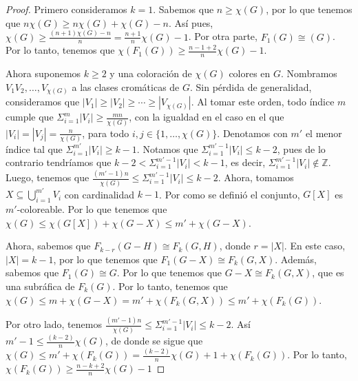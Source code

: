 \begin{proof}
    Primero consideramos $k=1$. Sabemos que $n \geq \chi(G)$, por lo que tenemos
    que $n\chi(G) \geq n\chi(G) + \chi(G) -n$. As\'i pues, $\chi (G) \geq
    \frac{(n+1)\chi(G)-n}{n} = \frac{n+1}{n}\chi (G) -1$. Por otra parte,
    $F_1(G) \cong (G)$. Por lo tanto, tenemos que $\chi(F_1(G)) \geq
    \frac{n-1+2}{n} \chi(G) -1$.
        
    Ahora suponemos $k \geq 2$ y una coloraci\'on de $\chi(G)$ colores en $G$.
    Nombramos $V_1 V_2, \dots, V_{\chi(G)}$ a las clases crom\'aticas de $G$.
    Sin p\'erdida de generalidad, consideramos que $|V_1|\geq |V_2|\geq \cdots
    \geq |V_{\chi(G)}|$. Al tomar este orden, todo \'indice $m$ cumple que
    $\Sigma_{i=1}^{m}|V_i| \geq \frac{mn}{\chi(G)}$, con la igualdad en el caso
    en el que $|V_i| = |V_j| = \frac{n}{\chi(G)}$, para todo $i,j \in \{1,
    \dots, \chi(G)\}$. Denotamos con $m'$ el menor \'indice tal que
    $\Sigma_{i=1}^{m'}|V_i| \geq k-1$. Notamos que $\Sigma_{i=1}^{m'-1}|V_i|
    \leq k-2$, pues de lo contrario tendr\'iamos que
    $k-2<\Sigma_{i=1}^{m'-1}|V_i| < k-1$, es decir, $\Sigma_{i=1}^{m'-1}|V_i|
    \notin \mathbb{Z}$. Luego, tenemos que $\frac{(m'-1)n}{\chi(G)}\leq
    \Sigma_{i=1}^{m'-1}|V_i| \leq k-2$. Ahora, tomamos $X \subseteq
    \bigcup_{i=1}^{m'} V_i$ con cardinalidad $k-1$. Por como se defini\'o el
    conjunto, $G[X]$ es $m'$-coloreable.
    Por lo que tenemos que  $\chi(G) \leq \chi(G[X])+\chi(G-X) \leq m' +
    \chi(G-X)$.
        
    Ahora, sabemos que $F_{k-r}(G-H) \cong F_k(G,H)$, donde $r = |X|$. En este
    caso, $|X| = k-1$, por lo que tenemos que $F_1(G-X) \cong F_k(G,X)$.
    Adem\'as, sabemos que $F_1(G) \cong G$. Por lo que tenemos que $G-X \cong
    F_k(G,X)$, que es una subr\'afica de $F_k(G)$. Por lo tanto, tenemos que
    $\chi(G) \leq m + \chi(G-X) = m' + \chi(F_k(G,X)) \leq m' + \chi(F_k(G))$. 
            
    Por otro lado, tenemos $\frac{(m'-1)n}{\chi(G)}\leq \Sigma_{i=1}^{m'-1}|V_i|
    \leq k-2$. As\'i $m'-1 \leq \frac{(k-2)}{n}\chi(G)$, de donde se sigue
    que $\chi(G) \leq m' + \chi(F_k(G)) = \frac{(k-2)}{n}\chi(G) +1 +
    \chi(F_k(G))$. Por lo tanto, $\chi(F_k(G)) \geq \frac{n-k+2}{n} \chi(G) -1$
\end{proof}


